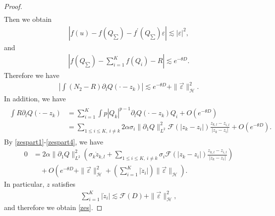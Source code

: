 \documentclass[reqno]{amsart}
\theoremstyle{plain}
\theoremstyle{definition}
\numberwithin{equation}{section}
\newcommand{\1}{\mathbbm{1}}
\begin{document}
\begin{proof}
\begin{align*}
\end{align*}
Then we obtain
\begin{align*}
\left|f(u)-f(Q_{\sum})-f^{\prime}(Q_{\sum})\varepsilon\right|\lesssim |\varepsilon|^2,
\end{align*}
and
\begin{align*}
|f(Q_{\sum})-\sum_{i=1}^Kf(Q_i)-R|\lesssim e^{-\theta D}.
\end{align*}
Therefore we have
\begin{align}\label{zespart3}
\left|\int (N_2-R){\partial}_lQ(\cdot-z_k)\right|\lesssim e^{-\theta D}+\|\vec{\varepsilon}\|_{\mathcal{H}}^2.
\end{align}
In addition, we have
\begin{align}\label{zespart4}
\begin{aligned}
\int R{\partial}_lQ(\cdot-z_k)&=\sum_{i=1}^K\int p|Q_k|^{p-1}{\partial}_lQ(\cdot-z_k)Q_i+O(e^{-\theta D})
\\
&=\sum_{1\leq i\leq K,\ i\neq k}2\alpha\sigma_i \|{\partial}_1Q\|_{L^2}^2\mathcal{F}(|z_k-z_i|) \frac{z_{k,l}-z_{i,l}}{|z_k-z_i|}+O(e^{-\theta D}).
\end{aligned}
\end{align}
By \eqref{zespart1}-\eqref{zespart4}, we have
\begin{align*}
0&=2\alpha\|{\partial}_1Q\|_{L^2}^2\left( \sigma_k\dot{z}_{k,l}+\sum_{1\leq i\leq K,\ i\neq k}\sigma_i \mathcal{F}(|z_k-z_i|) \frac{z_{k,l}-z_{i,l}}{|z_k-z_i|}\right)
\\
&\quad +O\left(e^{-\theta D}+\|\vec{\varepsilon}\|_{\mathcal{H}}^2+\left(\sum_{i=1}^K|\dot{z}_i|\right)\|\vec{\varepsilon}\|_{\mathcal{H}}\right).
\end{align*}
In particular, $z$ satisfies
\begin{align*}
\sum_{i=1}^K |\dot{z}_i|\lesssim \mathcal{F}(D)+\|\vec{\varepsilon}\|_{\mathcal{H}}^2,
\end{align*}
and therefore we obtain \eqref{zes}.


\end{proof}
\end{document}
